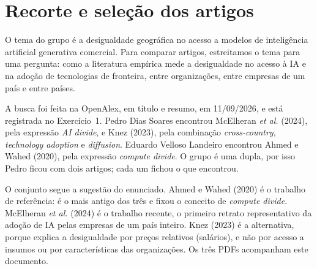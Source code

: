 \section*{Recorte e seleção dos artigos}

O tema do grupo é a desigualdade geográfica no acesso a modelos de inteligência artificial
generativa comercial. Para comparar artigos, estreitamos o tema para uma pergunta: como a
literatura empírica mede a desigualdade no acesso à IA e na adoção de tecnologias de fronteira,
entre organizações, entre empresas de um país e entre países.

A busca foi feita na OpenAlex, em título e resumo, em 11/09/2026, e está registrada no
Exercício~1. Pedro Dias Soares encontrou McElheran \emph{et al.} (2024), pela expressão \emph{AI
divide}, e Knez (2023), pela combinação \emph{cross-country}, \emph{technology adoption} e
\emph{diffusion}. Eduardo Velloso Landeiro encontrou Ahmed e Wahed (2020), pela expressão
\emph{compute divide}. O grupo é uma dupla, por isso Pedro ficou com dois artigos; cada um fichou o
que encontrou.

O conjunto segue a sugestão do enunciado. Ahmed e Wahed (2020) é o trabalho de referência: é o mais
antigo dos três e fixou o conceito de \emph{compute divide}. McElheran \emph{et al.} (2024) é o
trabalho recente, o primeiro retrato representativo da adoção de IA pelas empresas de um país
inteiro. Knez (2023) é a alternativa, porque explica a desigualdade por preços relativos
(salários), e não por acesso a insumos ou por características das organizações. Os três PDFs
acompanham este documento.
